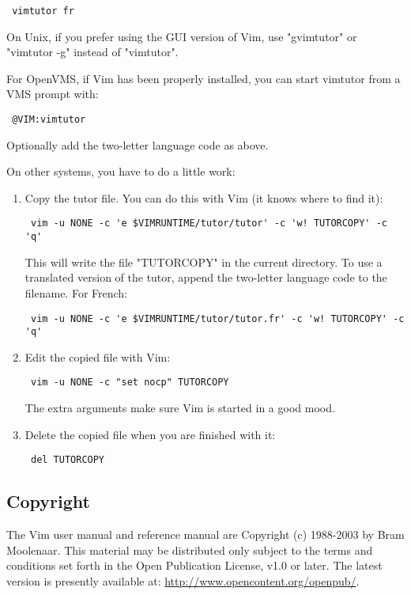 \begin{verbatim}
 vimtutor fr
\end{verbatim}

On Unix, if you prefer using the GUI version of Vim, use "gvimtutor" or
"vimtutor -g" instead of "vimtutor".

For OpenVMS, if Vim has been properly installed, you can start vimtutor from a
VMS prompt with:

\begin{verbatim}
 @VIM:vimtutor
\end{verbatim}

Optionally add the two-letter language code as above.

On other systems, you have to do a little work:
\begin{enumerate}
				\item Copy the tutor file. You can do this with Vim (it knows where to find it):
								\begin{verbatim}
 vim -u NONE -c 'e $VIMRUNTIME/tutor/tutor' -c 'w! TUTORCOPY' -c 'q'
								\end{verbatim}
								This will write the file "TUTORCOPY" in the current directory.
								To use a
								translated version of the tutor, append the two-letter language code to the
								filename. For French:
								\begin{verbatim}
 vim -u NONE -c 'e $VIMRUNTIME/tutor/tutor.fr' -c 'w! TUTORCOPY' -c 'q'
								\end{verbatim}

				\item Edit the copied file with Vim:
								\begin{verbatim}
 vim -u NONE -c "set nocp" TUTORCOPY
								\end{verbatim}
								The extra arguments make sure Vim is started in a good mood.

				\item Delete the copied file when you are finished with it:
								\begin{verbatim}
 del TUTORCOPY
								\end{verbatim}
\end{enumerate}
\subsection{Copyright}
\label{manual-copyright}

The Vim user manual and reference manual are Copyright (c) 1988-2003 by Bram Moolenaar.
This material may be distributed only subject to the terms and conditions set forth in the Open Publication License, v1.0 or later.
The latest version is presently available at: \url{http://www.opencontent.org/openpub/}.

